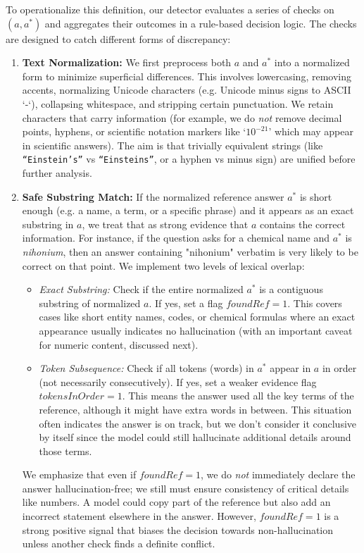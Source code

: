 \documentclass{article}
\begin{document}
To operationalize this definition, our detector evaluates a series of checks on $(a, a^*)$ and aggregates their outcomes in a rule-based decision logic. The checks are designed to catch different forms of discrepancy:
\begin{enumerate}
    \item \textbf{Text Normalization:} We first preprocess both $a$ and $a^*$ into a normalized form to minimize superficial differences. This involves lowercasing, removing accents, normalizing Unicode characters (e.g. Unicode minus signs to ASCII `-`), collapsing whitespace, and stripping certain punctuation. We retain characters that carry information (for example, we do \emph{not} remove decimal points, hyphens, or scientific notation markers like `$10^{-21}$' which may appear in scientific answers). The aim is that trivially equivalent strings (like \texttt{“Einstein’s”} vs \texttt{“Einsteins”}, or a hyphen vs minus sign) are unified before further analysis.

    \item \textbf{Safe Substring Match:} If the normalized reference answer $a^*$ is short enough (e.g. a name, a term, or a specific phrase) and it appears as an exact substring in $a$, we treat that as strong evidence that $a$ contains the correct information. For instance, if the question asks for a chemical name and $a^*$ is \emph{nihonium}, then an answer containing "nihonium" verbatim is very likely to be correct on that point. We implement two levels of lexical overlap:
    \begin{itemize}
        \item \emph{Exact Substring:} Check if the entire normalized $a^*$ is a contiguous substring of normalized $a$. If yes, set a flag $\mathit{foundRef}=1$. This covers cases like short entity names, codes, or chemical formulas where an exact appearance usually indicates no hallucination (with an important caveat for numeric content, discussed next).
        \item \emph{Token Subsequence:} Check if all tokens (words) in $a^*$ appear in $a$ in order (not necessarily consecutively). If yes, set a weaker evidence flag $\mathit{tokensInOrder}=1$. This means the answer used all the key terms of the reference, although it might have extra words in between. This situation often indicates the answer is on track, but we don't consider it conclusive by itself since the model could still hallucinate additional details around those terms.
    \end{itemize}
    We emphasize that even if $\mathit{foundRef}=1$, we do \emph{not} immediately declare the answer hallucination-free; we still must ensure consistency of critical details like numbers. A model could copy part of the reference but also add an incorrect statement elsewhere in the answer. However, $\mathit{foundRef}=1$ is a strong positive signal that biases the decision towards non-hallucination unless another check finds a definite conflict.


\end{enumerate}
\end{document}
